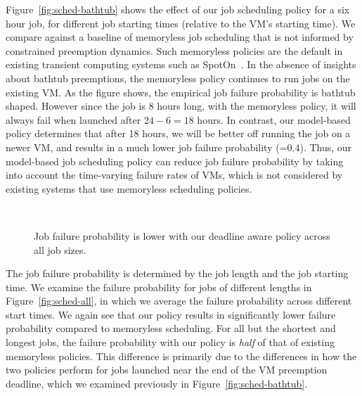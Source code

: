 Figure~\ref{fig:sched-bathtub} shows the effect of our job scheduling policy for a six hour job, for different job starting times (relative to the VM's starting time). 
We compare against a baseline of memoryless job scheduling that is not informed by constrained preemption dynamics.
Such memoryless policies are the default in existing transient computing systems such as SpotOn~\cite{spoton}. 
In the absence of insights about bathtub preemptions, the memoryless policy continues to run jobs on the existing VM. 
As the figure shows, the empirical job failure probability is bathtub shaped. 
However since the job is 8 hours long, with the memoryless policy, it will always fail when launched after $24-6=18$ hours.
In contrast, our model-based policy determines that after 18 hours, we will be better off running the job on a newer VM, and results in a much lower job failure probability (=0.4).
Thus, our model-based job scheduling policy can reduce job failure probability by taking into account the time-varying failure rates of VMs, which is not considered by existing systems that use memoryless scheduling policies.


\begin{figure}[t]
  \\
  \caption{Job failure probability is lower with our deadline aware policy across all job sizes.}
  \label{fig:sched-both}
\end{figure}

The job failure probability is determined by the job length and the job starting time.
We examine the failure probability for jobs of different lengths in Figure~\ref{fig:sched-all}, in which we average the failure probability across different start times.
We again see that our policy results in significantly lower failure probability compared to memoryless scheduling.
For all but the shortest and longest jobs, the failure probability with our policy is \emph{half} of that of existing memoryless policies.
This difference is primarily due to the differences in how the two policies perform for jobs launched near the end of the VM preemption deadline, which we examined previously in Figure~\ref{fig:sched-bathtub}. 


